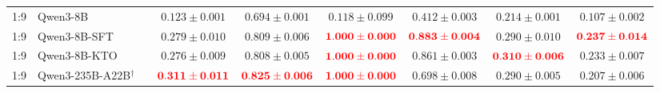 \documentclass[pdflatex,sn-mathphys-num]{sn-jnl}
\begin{document}
\begin{landscape}
\begin{longtable}{clccccccc}
1:9 & Qwen3-8B &  & \(0.123 \pm 0.001\) & \(0.694 \pm 0.001\) & \(0.118 \pm 0.099\) & \(0.412 \pm 0.003\) & \(0.214 \pm 0.001\) & \(0.107 \pm 0.002\) \\
1:9 & Qwen3-8B-SFT &  & \(\mathbf{0.279 \pm 0.010}\) & \(\mathbf{0.809 \pm 0.006}\) & \(\textcolor{red}{\mathbf{1.000 \pm 0.000}}\) & \(\textcolor{red}{\mathbf{0.883 \pm 0.004}}\) & \(\mathbf{0.290 \pm 0.010}\) & \(\textcolor{red}{\mathbf{0.237 \pm 0.014}}\) \\
1:9 & Qwen3-8B-KTO &  & \(0.276 \pm 0.009\) & \(0.808 \pm 0.005\) & \(\textcolor{red}{\mathbf{1.000 \pm 0.000}}\) & \(\mathbf{0.861 \pm 0.003}\) & \(\textcolor{red}{\mathbf{0.310 \pm 0.006}}\) & \(\mathbf{0.233 \pm 0.007}\) \\
1:9 & Qwen3-235B-A22B$^{\dagger}$ &  & \(\textcolor{red}{\mathbf{0.311 \pm 0.011}}\) & \(\textcolor{red}{\mathbf{0.825 \pm 0.006}}\) & \(\textcolor{red}{\mathbf{1.000 \pm 0.000}}\) & \(0.698 \pm 0.008\) & \(0.290 \pm 0.005\) & \(0.207 \pm 0.006\) \\
\end{longtable}
\end{landscape}
\end{document}
